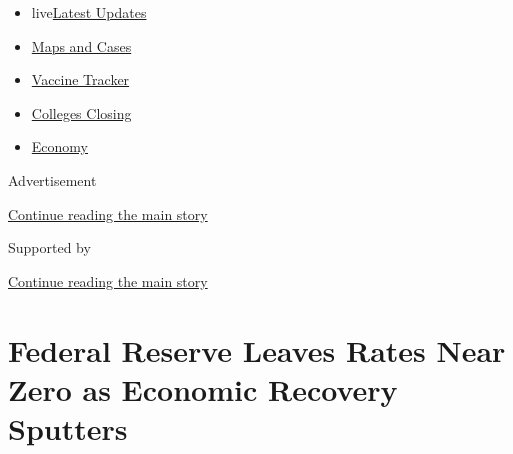 \begin{itemize}
\tightlist
\item
  live\href{https://www.nytimes3xbfgragh.onion/2020/08/21/world/covid-19-coronavirus.html?name=styln-coronavirus-markets\&region=TOP_BANNER\&variant=undefined\&block=storyline_menu_recirc\&action=click\&pgtype=Article\&impression_id=623e6ec0-e3a1-11ea-912a-61b8543016b1}{Latest
  Updates}
\item
  \href{https://www.nytimes3xbfgragh.onion/interactive/2020/us/coronavirus-us-cases.html?name=styln-coronavirus-markets\&region=TOP_BANNER\&variant=undefined\&block=storyline_menu_recirc\&action=click\&pgtype=Article\&impression_id=623e6ec1-e3a1-11ea-912a-61b8543016b1}{Maps
  and Cases}
\item
  \href{https://www.nytimes3xbfgragh.onion/interactive/2020/science/coronavirus-vaccine-tracker.html?name=styln-coronavirus-markets\&region=TOP_BANNER\&variant=undefined\&block=storyline_menu_recirc\&action=click\&pgtype=Article\&impression_id=623e6ec2-e3a1-11ea-912a-61b8543016b1}{Vaccine
  Tracker}
\item
  \href{https://www.nytimes3xbfgragh.onion/2020/08/19/us/colleges-closing-covid.html?name=styln-coronavirus-markets\&region=TOP_BANNER\&variant=undefined\&block=storyline_menu_recirc\&action=click\&pgtype=Article\&impression_id=623e6ec3-e3a1-11ea-912a-61b8543016b1}{Colleges
  Closing}
\item
  \href{https://www.nytimes3xbfgragh.onion/live/2020/08/20/business/stock-market-today-coronavirus?name=styln-coronavirus-markets\&region=TOP_BANNER\&variant=undefined\&block=storyline_menu_recirc\&action=click\&pgtype=Article\&impression_id=623e6ec4-e3a1-11ea-912a-61b8543016b1}{Economy}
\end{itemize}

Advertisement

\protect\hyperlink{after-top}{Continue reading the main story}

Supported by

\protect\hyperlink{after-sponsor}{Continue reading the main story}

\hypertarget{federal-reserve-leaves-rates-near-zero-as-economic-recovery-sputters}{%
\section{Federal Reserve Leaves Rates Near Zero as Economic Recovery
Sputters}\label{federal-reserve-leaves-rates-near-zero-as-economic-recovery-sputters}}


